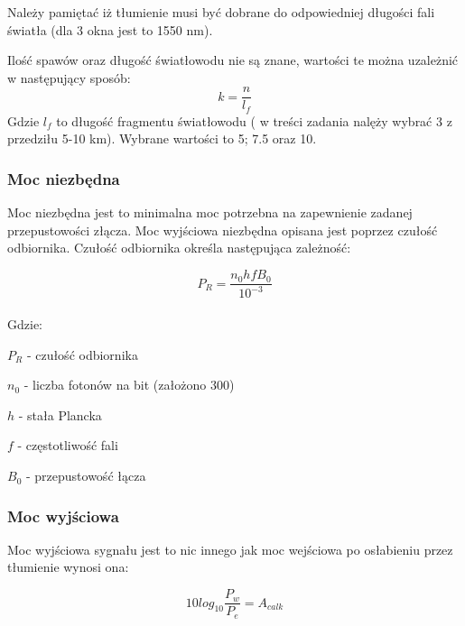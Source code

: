 \documentclass[paper=a4, fontsize=11pt]{scrartcl} %
\numberwithin{equation}{section} %
\numberwithin{figure}{section} %
\numberwithin{table}{section} %
\begin{document}
Należy pamiętać iż tłumienie musi być dobrane do odpowiedniej długości fali światła (dla 3 okna jest to 1550 nm).

Ilość spawów oraz długość światłowodu nie są znane, wartości te można uzależnić w następujący sposób:
\begin{equation} \label{eq:iloscodc} 
  k = \frac{n}{l_f}
\end{equation}
Gdzie \(l_f\) to długość fragmentu światłowodu ( w treści zadania nalęży wybrać 3 z przedziłu 5-10 km).
Wybrane wartości to 5; 7.5 oraz 10.

\subsubsection{Moc niezbędna}

Moc niezbędna jest to minimalna moc potrzebna na zapewnienie zadanej przepustowości złącza. Moc wyjściowa niezbędna opisana jest
poprzez czułość odbiornika. Czułość odbiornika określa następująca zależność: 

\begin{equation} \label{eq:czulosc} 
  P_R = \frac{n_0hfB_0}{10^{-3}}
\end{equation}
\\
Gdzie:\\
\par \setlength\parindent{24pt}
\(P_R\) - czułość odbiornika\\
\par \setlength\parindent{24pt}
\(n_0\) - liczba fotonów na bit (założono 300)\\
\par \setlength\parindent{24pt}
\(h\) - stała Plancka\\
\par \setlength\parindent{24pt}
\(f\) - częstotliwość fali\\
\par \setlength\parindent{24pt}
\(B_0\) - przepustowość łącza\newline

\subsubsection{Moc wyjściowa}

\par Moc wyjściowa sygnału jest to nic innego jak moc wejściowa po osłabieniu przez tłumienie wynosi ona:

\begin{equation} \label{eq:mocwyjsc} 
  10log_{10}\frac{P_w}{P_e} = A_{calk}
\end{equation}
\end{document}
